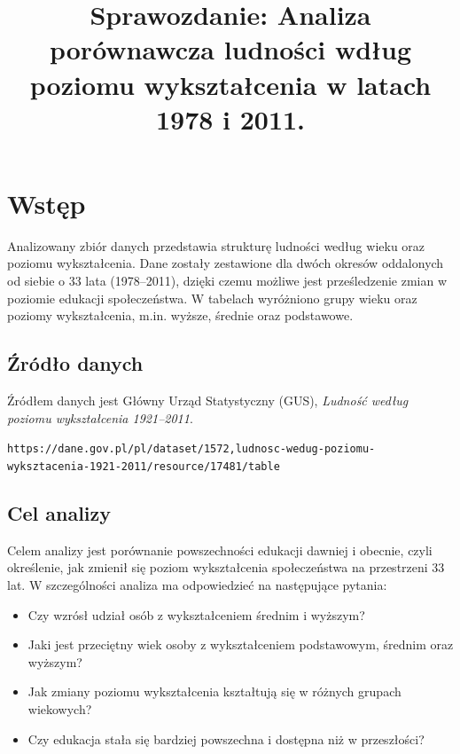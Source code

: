 \documentclass[10pt]{article}
\begin{document}
{\centering
\title{Sprawozdanie: Analiza porównawcza ludności wdług poziomu wykształcenia w latach 1978 i 2011.}
\date{}
\maketitle}

\section{Wstęp}
Analizowany zbiór danych przedstawia strukturę ludności według wieku oraz poziomu wykształcenia. Dane zostały zestawione dla dwóch okresów oddalonych od siebie o 33 lata (1978--2011), dzięki czemu możliwe jest prześledzenie zmian w poziomie edukacji społeczeństwa. W tabelach wyróżniono grupy wieku oraz poziomy wykształcenia, m.in. wyższe, średnie oraz podstawowe.

\subsection{Źródło danych}

Źródłem danych jest Główny Urząd Statystyczny (GUS), \textit{Ludność według poziomu wykształcenia 1921--2011}.

\begin{flushleft}
	\texttt{https://dane.gov.pl/pl/dataset/1572,ludnosc-wedug-poziomu-wyksztacenia-1921-2011/resource/17481/table}
\end{flushleft}

\subsection{Cel analizy}

Celem analizy jest porównanie powszechności edukacji dawniej i obecnie, czyli określenie, jak zmienił się poziom wykształcenia społeczeństwa na przestrzeni 33 lat. W szczególności analiza ma odpowiedzieć na następujące pytania:

\begin{itemize}
	\item Czy wzrósł udział osób z wykształceniem średnim i wyższym?
	\item Jaki jest przeciętny wiek osoby z wykształceniem podstawowym, średnim oraz wyższym?
	\item Jak zmiany poziomu wykształcenia kształtują się w różnych grupach wiekowych?
	\item Czy edukacja stała się bardziej powszechna i dostępna niż w przeszłości?
\end{itemize}
\end{document}
